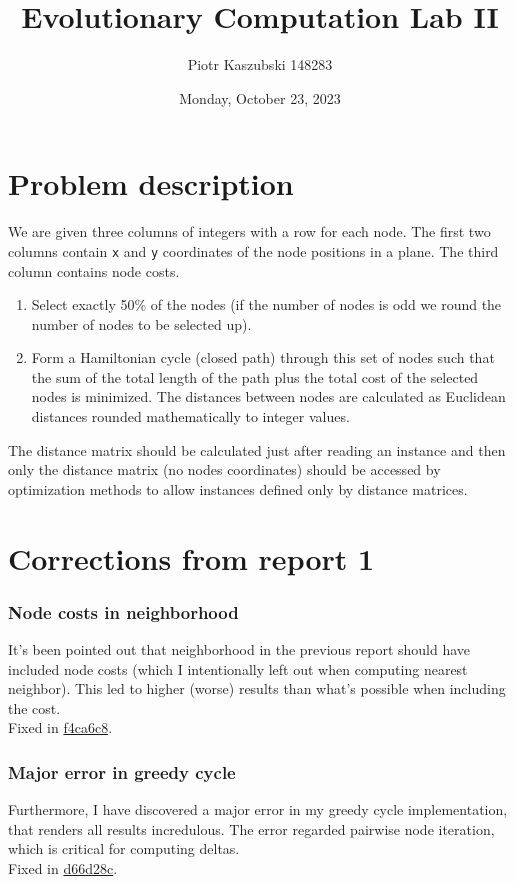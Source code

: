 \documentclass[14pt]{article}
\title{Evolutionary Computation Lab II}
\author{Piotr Kaszubski 148283}
\date{Monday, October 23, 2023}
\begin{document}
\maketitle
\tableofcontents
\newpage

\section{Problem description}
We are given three columns of integers with a row for each node. The first two
columns contain \verb`x` and \verb`y` coordinates of the node positions in a
plane. The third column contains node costs.

\begin{enumerate}
	\item Select exactly 50\% of the nodes (if the number of nodes is odd we
		round the number of nodes to be selected up).
	\item Form a Hamiltonian cycle (closed path) through this set of nodes such
		that the sum of the total length of the path plus the total cost of the
		selected nodes is minimized. The distances between nodes are calculated
		as Euclidean distances rounded mathematically to integer values.
\end{enumerate}

The distance matrix should be calculated just after reading an instance and
then only the distance matrix (no nodes coordinates) should be accessed by
optimization methods to allow instances defined only by distance matrices.

\section{Corrections from report 1}
\subsubsection*{Node costs in neighborhood}
It's been pointed out that neighborhood in the previous report should have
included node costs (which I intentionally left out when computing nearest
neighbor). This led to higher (worse) results than what's possible when
including the cost.  \\
Fixed in \href{https://github.com/RoyalDonkey/put-ec-tasks/commit/f4ca6c842cff9fb3afcf1d1afff631034c59c6d8}{f4ca6c8}.

\subsubsection*{Major error in greedy cycle}
Furthermore, I have discovered a major error in my greedy cycle implementation,
that renders all results incredulous. The error regarded pairwise node
iteration, which is critical for computing deltas. \\
Fixed in \href{https://github.com/RoyalDonkey/put-ec-tasks/commit/d66d28c938dc39f43280bdbc76b273e55cfd589b}{d66d28c}.
\end{document}
